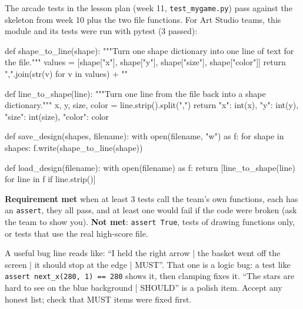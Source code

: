 \begin{answer}
The arcade tests in the lesson plan (week 11, \texttt{test\_mygame.py}) pass against the skeleton
from week 10 plus the two file functions. For Art Studio teams, this module and its tests were run
with pytest (3 passed):
\begin{pycode}
def shape_to_line(shape):
    """Turn one shape dictionary into one line of text for the file."""
    values = [shape["x"], shape["y"], shape["size"], shape["color"]]
    return ",".join(str(v) for v in values) + "\n"

def line_to_shape(line):
    """Turn one line from the file back into a shape dictionary."""
    x, y, size, color = line.strip().split(",")
    return {"x": int(x), "y": int(y), "size": int(size), "color": color}

def save_design(shapes, filename):
    with open(filename, "w") as f:
        for shape in shapes:
            f.write(shape_to_line(shape))

def load_design(filename):
    with open(filename) as f:
        return [line_to_shape(line) for line in f if line.strip()]
\end{pycode}
\textbf{Requirement met} when at least 3 tests call the team's own functions, each has an
\texttt{assert}, they all pass, and at least one would fail if the code were broken (ask the team to
show you). \textbf{Not met}: \texttt{assert True}, tests of drawing functions only, or tests that use
the real high-score file.
\end{answer}

\begin{answer}
A useful bug line reads like: \enquote{I held the right arrow | the basket went off the screen | it
should stop at the edge | MUST}. That one is a logic bug: a test like
\texttt{assert next\_x(280, 1) == 280} shows it, then clamping fixes it. \enquote{The stars are hard to
see on the blue background | SHOULD} is a polish item. Accept any honest list; check that MUST items
were fixed first.
\end{answer}

